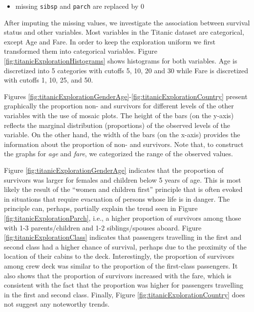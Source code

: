 \documentclass[12pt,]{krantz}
\newenvironment{Shaded}{\begin{snugshade}}{\end{snugshade}}
\newcommand{\DecValTok}[1]{\textcolor[rgb]{0.00,0.00,0.81}{#1}}
\newcommand{\KeywordTok}[1]{\textcolor[rgb]{0.13,0.29,0.53}{\textbf{#1}}}
\newcommand{\NormalTok}[1]{#1}
\newcommand{\OperatorTok}[1]{\textcolor[rgb]{0.81,0.36,0.00}{\textbf{#1}}}
\newcommand{\StringTok}[1]{\textcolor[rgb]{0.31,0.60,0.02}{#1}}
\providecommand{\tightlist}{%
  \setlength{\itemsep}{0pt}\setlength{\parskip}{0pt}}
\begin{document}
\begin{itemize}
\tightlist
\item
  missing \texttt{sibsp} and \texttt{parch} are replaced by 0
\end{itemize}

\begin{Shaded}
\end{Shaded}

After imputing the missing values, we investigate the association between survival status and other variables. Most variables in the Titanic dataset are categorical, except Age and Fare. In order to keep the exploration uniform we first transformed them into categorical variables. Figure \ref{fig:titanicExplorationHistograms} shows histograms for both variables. Age is discretized into 5 categories with cutoffs 5, 10, 20 and 30 while Fare is discretized with cutoffs 1, 10, 25, and 50.

Figures \ref{fig:titanicExplorationGenderAge}-\ref{fig:titanicExplorationCountry} present graphically the proportion non- and survivors for different levels of the other variables with the use of mosaic plots. The height of the bars (on the y-axis) reflects the marginal distribution (proportions) of the observed levels of the variable. On the other hand, the width of the bars (on the x-axis) provides the information about the proportion of non- and survivors. Note that, to construct the graphs for \emph{age} and \emph{fare}, we categorized the range of the observed values.

Figure \ref{fig:titanicExplorationGenderAge} indicates that the proportion of survivors was larger for females and children below 5 years of age. This is most likely the result of the ``women and children first'' principle that is often evoked in situations that require evacuation of persons whose life is in danger. The principle can, perhaps, partially explain the trend seen in Figure \ref{fig:titanicExplorationParch}, i.e., a higher proportion of survivors among those with 1-3 parents/children and 1-2 siblings/spouses aboard. Figure \ref{fig:titanicExplorationClass} indicates that passengers travelling in the first and second class had a higher chance of survival, perhaps due to the proximity of the location of their cabins to the deck. Interestingly, the proportion of survivors among crew deck was similar to the proportion of the first-class passengers. It also shows that the proportion of survivors increased with the fare, which is consistent with the fact that the proportion was higher for passengers travelling in the first and second class. Finally, Figure \ref{fig:titanicExplorationCountry} does not suggest any noteworthy trends.
\end{document}

